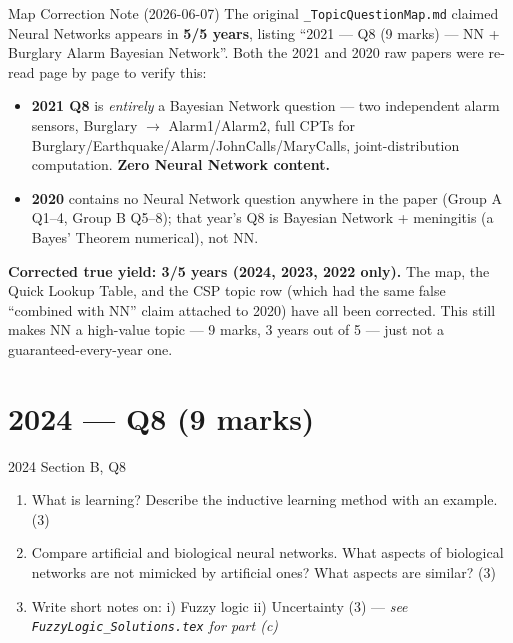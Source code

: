 \documentclass[12pt,a4paper]{article}
\begin{document}
\begin{warnbox}{Map Correction Note (2026-06-07)}
The original \texttt{\_TopicQuestionMap.md} claimed Neural Networks appears in \textbf{5/5 years}, listing ``2021 --- Q8 (9 marks) --- NN + Burglary Alarm Bayesian Network''. Both the 2021 and 2020 raw papers were re-read page by page to verify this:
\begin{itemize}[noitemsep]
  \item \textbf{2021 Q8} is \emph{entirely} a Bayesian Network question --- two independent alarm sensors, Burglary $\to$ Alarm1/Alarm2, full CPTs for Burglary/Earthquake/Alarm/JohnCalls/MaryCalls, joint-distribution computation. \textbf{Zero Neural Network content.}
  \item \textbf{2020} contains no Neural Network question anywhere in the paper (Group A Q1--4, Group B Q5--8); that year's Q8 is Bayesian Network + meningitis (a Bayes' Theorem numerical), not NN.
\end{itemize}
\textbf{Corrected true yield: 3/5 years (2024, 2023, 2022 only).} The map, the Quick Lookup Table, and the CSP topic row (which had the same false ``combined with NN'' claim attached to 2020) have all been corrected. This still makes NN a high-value topic --- 9 marks, 3 years out of 5 --- just not a guaranteed-every-year one.
\end{warnbox}

\newpage
\section{2024 --- Q8 (9 marks)}

\begin{qbox}{2024 Section B, Q8}
\begin{enumerate}[label=(\alph*)]
  \item What is learning? Describe the inductive learning method with an example. (3)
  \item Compare artificial and biological neural networks. What aspects of biological networks are not mimicked by artificial ones? What aspects are similar? (3)
  \item Write short notes on: i) Fuzzy logic ii) Uncertainty (3) --- \textit{see \texttt{FuzzyLogic\_Solutions.tex} for part (c)}
\end{enumerate}
\end{qbox}
\end{document}
